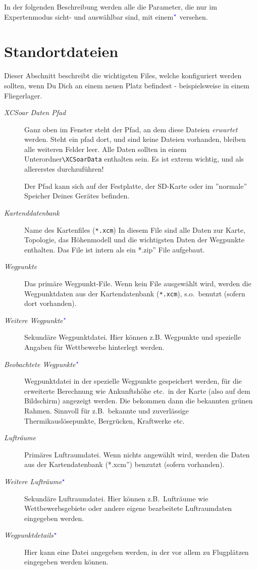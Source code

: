 \tip In der folgenden Beschreibung werden alle die
Parameter, die nur im Expertenmodus sicht- und auswählbar sind, mit
einem$^{\textcolor{blue}{\star}}$ versehen.


\section{Standortdateien}\label{sec:site-files}
Dieser Abschnitt beschreibt die wichtigsten Files, welche konfiguriert werden sollten, wenn
Du Dich an einem neuen Platz befindest - beispielsweise in einem Fliegerlager.

\begin{description}
\item[\textit{XCSoar Daten Pfad}]  Ganz oben im Fenster steht der Pfad, an dem diese Dateien \textsl{erwartet} werden.
Steht ein pfad dort, und sind keine Dateien vorhanden, bleiben alle weiteren Felder leer.
Alle Daten sollten in einem Unterordner\verb "\XCSoarData" enthalten sein.
Es ist extrem wichtig, und als allererstes durchzuführen!

Der Pfad kann sich auf der Festplatte, der SD-Karte oder im ''normale'' Speicher
Deines Gerätes befinden.
\item[\textit{Kartenddatenbank}]  Name des Kartenfiles (\verb"*.xcm") In diesem File sind alle Daten zur
Karte, Topologie, das Höhenmodell  und die wichtigsten Daten der Wegpunkte enthalten.
Das File ist intern als ein \verb''*.zip'' File aufgebaut.
\item[\textit{Wegpunkte}]  Das primäre Wegpunkt-File. Wenn kein File ausgewählt wird,
werden die Wegpunktdaten aus der Kartendatenbank (\verb"*.xcm"), s.o.\ benutzt
(sofern dort vorhanden).
\item[\textit{Weitere Wegpunkte$^{\textcolor{blue}{\star}}$}]  Sekundäre Wegpunktdatei. Hier können z.B. Wegpunkte und spezielle
Angaben für Wettbewerbe hinterlegt werden.
\item[\textit{Beobachtete Wegpunkte$^{\textcolor{blue}{\star}}$}]  Wegpunktdatei in der spezielle Wegpunkte gespeichert werden,
für die erweiterte Berechnung wie Ankunftshöhe etc.\  in der Karte (also auf dem Bildschirm)
angezeigt werden. Die bekommen dann die bekannten grünen Rahmen.
Sinnvoll für z.B.\ bekannte und zuverlässige Thermikauslösepunkte, Bergrücken, Kraftwerke etc.\
\item[\textit{Lufträume}]  Primäres Luftraumdatei. Wenn nichts angewählt wird, werden die Daten aus der
Kartendatenbank (\verb''*.xcm'') benzutzt (sofern vorhanden).
\item[\textit{Weitere Lufträume$^{\textcolor{blue}{\star}}$}]  Sekundäre Luftraumdatei. Hier  können z.B.\ Lufträume wie
Wettbewerbsgebiete oder andere eigene bearbeitete Luftraumdaten  eingegeben werden.
\item[\textit{Wegpunktdetails$^{\textcolor{blue}{\star}}$}]  Hier kann eine Datei angegeben werden, in der vor allem
 zu  Flugplätzen eingegeben werden können.
\end{description}


